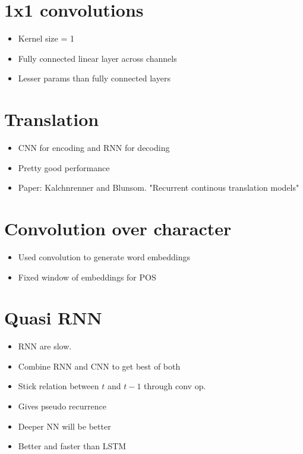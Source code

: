 \documentclass[a4paper]{article}
\begin{document}
\section{1x1 convolutions}
\begin{itemize}
    \item Kernel size = 1
    \item Fully connected linear layer across channels
    \item Lesser params than fully connected layers
\end{itemize}
\section{Translation}
\begin{itemize}
    \item CNN for encoding and RNN for decoding
    \item Pretty good performance
    \item Paper: Kalchnrenner and Blunsom. "Recurrent continous translation models"
\end{itemize}
\section{Convolution over character}
\begin{itemize}
    \item Used convolution to generate word embeddings
    \item Fixed window of embeddings for POS
\end{itemize}
\section{Quasi RNN}
\begin{itemize}
    \item RNN are slow.
    \item Combine RNN and CNN to get best of both
    \item Stick relation between $t$ and $t-1$ through conv op.
    \item Gives pseudo recurrence
    \item Deeper NN will be better
    \item Better and faster than LSTM
\end{itemize}
\end{document}
